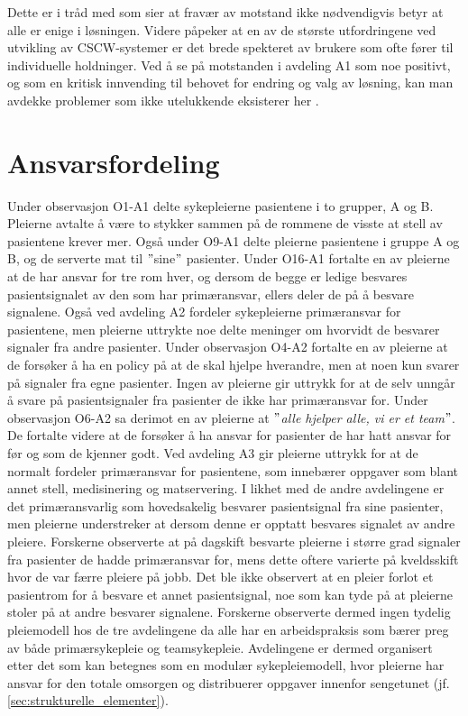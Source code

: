 \noindent
Dette er i tråd med \citet{Jacobsen12} som sier at fravær av motstand ikke nødvendigvis betyr at alle er enige i løsningen. Videre påpeker \citet{Berg99} at en av de største utfordringene ved utvikling av CSCW-systemer er det brede spekteret av brukere som ofte fører til individuelle holdninger. Ved å se på motstanden i avdeling A1 som noe positivt, og som en kritisk innvending til behovet for endring og valg av løsning, kan man avdekke problemer som ikke utelukkende eksisterer her \citep{Jacobsen}.

\section{Ansvarsfordeling}
Under observasjon O1-A1 delte sykepleierne pasientene i to grupper, A og B. Pleierne avtalte å være to stykker sammen på de rommene de visste at stell av pasientene krever mer. Også under O9-A1 delte pleierne pasientene i gruppe A og B, og de serverte mat til $"$sine$"$ pasienter. Under O16-A1 fortalte en av pleierne at de har ansvar for tre rom hver, og dersom de begge er ledige besvares pasientsignalet av den som har primæransvar, ellers deler de på å besvare signalene. Også ved avdeling A2 fordeler sykepleierne primæransvar for pasientene, men pleierne uttrykte noe delte meninger om hvorvidt de besvarer signaler fra andre pasienter.  Under observasjon O4-A2 fortalte en av pleierne at de forsøker å ha en policy på at de skal hjelpe hverandre, men at noen kun svarer på signaler fra egne pasienter. Ingen av pleierne gir uttrykk for at de selv unngår å svare på pasientsignaler fra pasienter de ikke har primæransvar for. Under observasjon O6-A2 sa derimot en av pleierne at \textit{$"$alle hjelper alle, vi er et team$"$}. De fortalte videre at de forsøker å ha ansvar for pasienter de har hatt ansvar for før og som de kjenner godt. Ved avdeling A3 gir pleierne uttrykk for at de normalt fordeler primæransvar for pasientene, som innebærer oppgaver som blant annet stell, medisinering og matservering. I likhet med de andre avdelingene er det primæransvarlig som hovedsakelig besvarer pasientsignal fra sine pasienter, men pleierne understreker at dersom denne er opptatt besvares signalet av andre pleiere. Forskerne observerte at på dagskift besvarte pleierne i større grad signaler fra pasienter de hadde primæransvar for, mens dette oftere varierte på kveldsskift hvor de var færre pleiere på jobb. Det ble ikke observert at en pleier forlot et pasientrom for å besvare et annet pasientsignal, noe som kan tyde på at pleierne stoler på at andre besvarer signalene. Forskerne observerte dermed ingen tydelig pleiemodell hos de tre avdelingene da alle har en arbeidspraksis som bærer preg av både primærsykepleie og teamsykepleie. Avdelingene er dermed organisert etter det som kan betegnes som en modulær sykepleiemodell, hvor pleierne har ansvar for den totale omsorgen og distribuerer oppgaver innenfor sengetunet (jf. \ref{sec:strukturelle_elementer}). 

